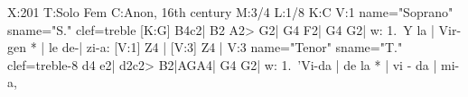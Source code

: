 X:201
T:Solo Fem
C:Anon, 16th century
M:3/4
L:1/8
K:C
V:1 name="Soprano" sname="S." clef=treble
[K:G] 
B4c2| B2 A2> G2| G4 F2| G4 G2| 
w: 1.~Y la | Vir-gen * | le de-| zi-a:
[V:1] Z4 |
[V:3] Z4 |
V:3 name="Tenor" sname="T." clef=treble-8
d4 e2| d2c2> B2|AGA4| G4 G2|
w: 1.~'Vi-da | de la * | vi - da | mi-a,
